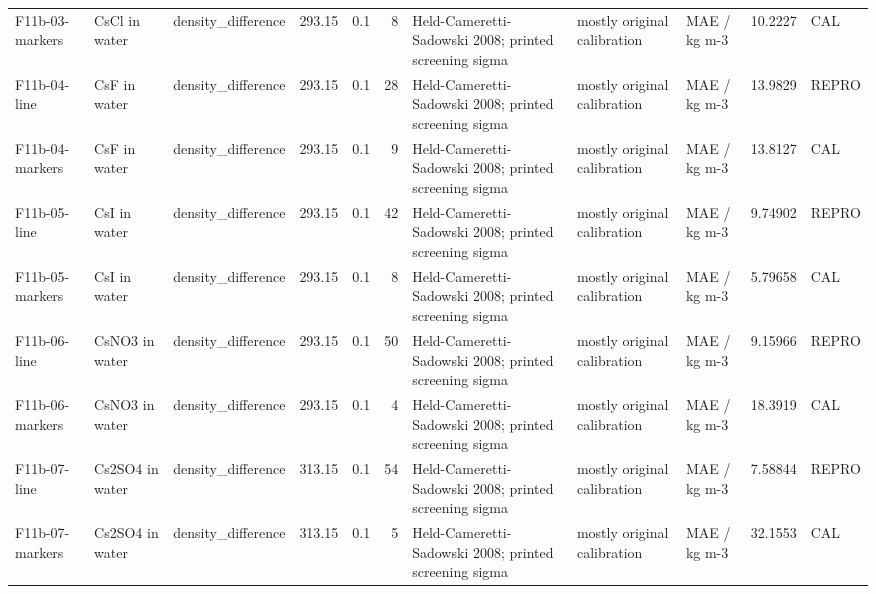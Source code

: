\begin{landscape}
\begin{longtable}{L{1.9cm}L{2.5cm}L{2.1cm}L{1.6cm}L{1.6cm}rL{2.4cm}L{1.9cm}L{2.2cm}rL{1cm}}
F11b-\allowbreak{}03-\allowbreak{}markers & CsCl in water & density\_\allowbreak{}difference & 293.15 & 0.1 & 8 & Held-\allowbreak{}Cameretti-\allowbreak{}Sadowski 2008; printed screening sigma & mostly original calibration & MAE /\allowbreak{} kg m-\allowbreak{}3 & 10.2227 & CAL \\
F11b-\allowbreak{}04-\allowbreak{}line & CsF in water & density\_\allowbreak{}difference & 293.15 & 0.1 & 28 & Held-\allowbreak{}Cameretti-\allowbreak{}Sadowski 2008; printed screening sigma & mostly original calibration & MAE /\allowbreak{} kg m-\allowbreak{}3 & 13.9829 & REPRO \\
F11b-\allowbreak{}04-\allowbreak{}markers & CsF in water & density\_\allowbreak{}difference & 293.15 & 0.1 & 9 & Held-\allowbreak{}Cameretti-\allowbreak{}Sadowski 2008; printed screening sigma & mostly original calibration & MAE /\allowbreak{} kg m-\allowbreak{}3 & 13.8127 & CAL \\
F11b-\allowbreak{}05-\allowbreak{}line & CsI in water & density\_\allowbreak{}difference & 293.15 & 0.1 & 42 & Held-\allowbreak{}Cameretti-\allowbreak{}Sadowski 2008; printed screening sigma & mostly original calibration & MAE /\allowbreak{} kg m-\allowbreak{}3 & 9.74902 & REPRO \\
F11b-\allowbreak{}05-\allowbreak{}markers & CsI in water & density\_\allowbreak{}difference & 293.15 & 0.1 & 8 & Held-\allowbreak{}Cameretti-\allowbreak{}Sadowski 2008; printed screening sigma & mostly original calibration & MAE /\allowbreak{} kg m-\allowbreak{}3 & 5.79658 & CAL \\
F11b-\allowbreak{}06-\allowbreak{}line & CsNO3 in water & density\_\allowbreak{}difference & 293.15 & 0.1 & 50 & Held-\allowbreak{}Cameretti-\allowbreak{}Sadowski 2008; printed screening sigma & mostly original calibration & MAE /\allowbreak{} kg m-\allowbreak{}3 & 9.15966 & REPRO \\
F11b-\allowbreak{}06-\allowbreak{}markers & CsNO3 in water & density\_\allowbreak{}difference & 293.15 & 0.1 & 4 & Held-\allowbreak{}Cameretti-\allowbreak{}Sadowski 2008; printed screening sigma & mostly original calibration & MAE /\allowbreak{} kg m-\allowbreak{}3 & 18.3919 & CAL \\
F11b-\allowbreak{}07-\allowbreak{}line & Cs2SO4 in water & density\_\allowbreak{}difference & 313.15 & 0.1 & 54 & Held-\allowbreak{}Cameretti-\allowbreak{}Sadowski 2008; printed screening sigma & mostly original calibration & MAE /\allowbreak{} kg m-\allowbreak{}3 & 7.58844 & REPRO \\
F11b-\allowbreak{}07-\allowbreak{}markers & Cs2SO4 in water & density\_\allowbreak{}difference & 313.15 & 0.1 & 5 & Held-\allowbreak{}Cameretti-\allowbreak{}Sadowski 2008; printed screening sigma & mostly original calibration & MAE /\allowbreak{} kg m-\allowbreak{}3 & 32.1553 & CAL \\

\end{longtable}
\end{landscape}
